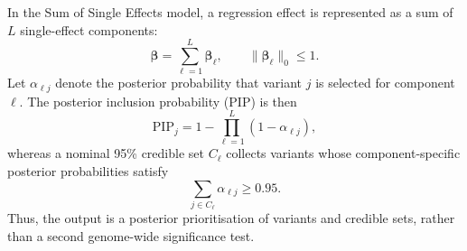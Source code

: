 \documentclass[11pt,a4paper]{article}
\begin{document}
In the Sum of Single Effects model, a regression effect is represented
as a sum of $L$ single-effect components:
\begin{equation}
\boldsymbol\beta = \sum_{\ell=1}^{L}\boldsymbol\beta_{\ell},
\qquad \|\boldsymbol\beta_{\ell}\|_0 \leq 1.
\end{equation}
Let $\alpha_{\ell j}$ denote the posterior probability that variant
$j$ is selected for component $\ell$. The posterior inclusion
probability (PIP) is then
\begin{equation}
\mathrm{PIP}_{j}=1-\prod_{\ell=1}^{L}(1-\alpha_{\ell j}),
\end{equation}
whereas a nominal 95\% credible set $C_{\ell}$ collects variants whose
component-specific posterior probabilities satisfy
\begin{equation}
\sum_{j\in C_{\ell}}\alpha_{\ell j}\geq 0.95.
\end{equation}
Thus, the output is a posterior prioritisation of variants and
credible sets, rather than a second genome-wide significance test.
\end{document}
